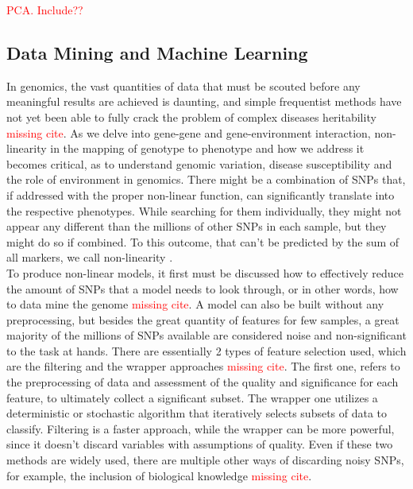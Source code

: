 \textcolor{red}{PCA. Include??}

\subsection{Data Mining and Machine Learning}
In genomics, the vast quantities of data that must be scouted before any meaningful results are achieved is daunting, and simple frequentist methods have not yet been able to fully crack the problem of complex diseases heritability \textcolor{red}{missing cite}. As we delve into gene-gene and gene-environment interaction, non-linearity in the mapping of genotype to phenotype and how we address it becomes critical, as to understand genomic variation, disease susceptibility and the role of environment in genomics. There might be a combination of SNPs that, if addressed with the proper non-linear function, can significantly translate into the respective phenotypes. While searching for them individually, they might not appear any different than the millions of other SNPs in each sample, but they might do so if combined. To this outcome, that can't be predicted by the sum of all markers, we call non-linearity \cite{moore2010bioinformatics}.\\
To produce non-linear models, it first must be discussed how to effectively reduce the amount of SNPs that a model needs to look through, or in other words, how to data mine the genome \textcolor{red}{missing cite}. A model can also be built without any preprocessing, but besides the great quantity of features for few samples, a great majority of the millions of SNPs available are considered noise and non-significant to the task at hands. There are essentially 2 types of feature selection used, which are the filtering and the wrapper approaches \textcolor{red}{missing cite}. The first one, refers to the preprocessing of data and assessment of the quality and significance for each feature, to ultimately collect a significant subset. The wrapper one utilizes a deterministic or stochastic algorithm that iteratively selects subsets of data to classify. Filtering is a faster approach, while the wrapper can be more powerful, since it doesn't discard variables with assumptions of quality. Even if these two methods are widely used, there are multiple other ways of discarding noisy SNPs, for example, the inclusion of biological knowledge \textcolor{red}{missing cite}.\\
